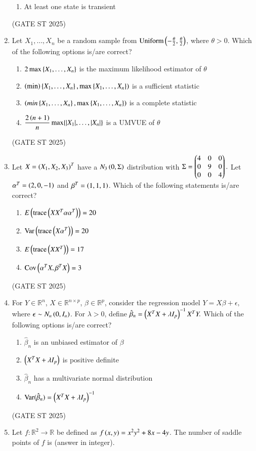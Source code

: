 \documentclass[journal,12pt,onecolumn]{IEEEtran}
\theoremstyle{remark}
\begin{document}
\begin{enumerate}
\begin{enumerate}
\item At least one state is transient
\end{enumerate}
\hfill{(GATE ST 2025)}
\item Let $X_1,\dots,X_n$ be a random sample from $\text{Uniform}\left(-\tfrac{\theta}{2},\tfrac{\theta}{2}\right)$, where $\theta>0$. Which of the following options is/are correct?
\begin{enumerate}
\item $2\max\left\{X_1,\dots,X_n\right\}$ is the maximum likelihood estimator of $\theta$
\item $\left(\min\right)\left\{X_1,\dots,X_n\right\}, \max\left\{X_1,\dots,X_n\right\})$ is a sufficient statistic
\item $\left(min\left\{X_1,\dots,X_n\right\}, \max\left\{X_1,\dots,X_n\right\}\right)$ is a complete statistic
\item $\dfrac{2\left(n+1\right)}{n}\max\{|X_1|,\dots,|X_n|\}$ is a UMVUE of $\theta$
\end{enumerate}
\hfill{(GATE ST 2025)}
\item Let $X=\left(X_1,X_2,X_3\right)^T$ have a $N_3\left(0,\Sigma\right)$ distribution with
$
\Sigma = \begin{pmatrix}
4 & 0 & 0 \\
0 & 9 & 0 \\
0 & 0 & 4
\end{pmatrix}.
$
Let $\alpha^T=\left(2,0,-1\right)$ and $\beta^T=\left(1,1,1\right)$. Which of the following statements is/are correct?
\begin{enumerate}
\item $E\left(\text{trace}\left(XX^T\alpha\alpha^T\right)\right)=20$
\item $\text{Var}\left(\text{trace}\left(X\alpha^T\right)\right)=20$
\item $E\left(\text{trace}\left(XX^T\right)\right)=17$
\item $\text{Cov}\left(\alpha^TX,\beta^TX\right)=3$
\end{enumerate}
\hfill{(GATE ST 2025)}
\item For $Y\in\mathbb{R}^n$, $X\in\mathbb{R}^{n\times p}$, $\beta\in\mathbb{R}^p$, consider the regression model
$
Y=X\beta+\epsilon,
$
where $\epsilon\sim N_n\left(0,I_n\right)$. For $\lambda>0$, define
$
\hat{\beta}_n=\left(X^TX+\lambda I_p\right)^{-1}X^TY.
$
Which of the following options is/are correct?
\begin{enumerate}
\item $\hat{\beta}_n$ is an unbiased estimator of $\beta$
\item $\left(X^TX+\lambda I_p\right)$ is positive definite
\item $\hat{\beta}_n$ has a multivariate normal distribution
\item $\text{Var}(\hat{\beta}_n)=\left(X^TX+\lambda I_p\right)^{-1}$
\end{enumerate}
\hfill{(GATE ST 2025)}
\item Let $f:\mathbb{R}^2\to\mathbb{R}$ be defined as $f\left(x,y\right)=x^2y^2+8x-4y$. The number of saddle points of $f$ is \underline{\phantom{imagine}} (answer in integer).


\end{enumerate}
\end{document}
